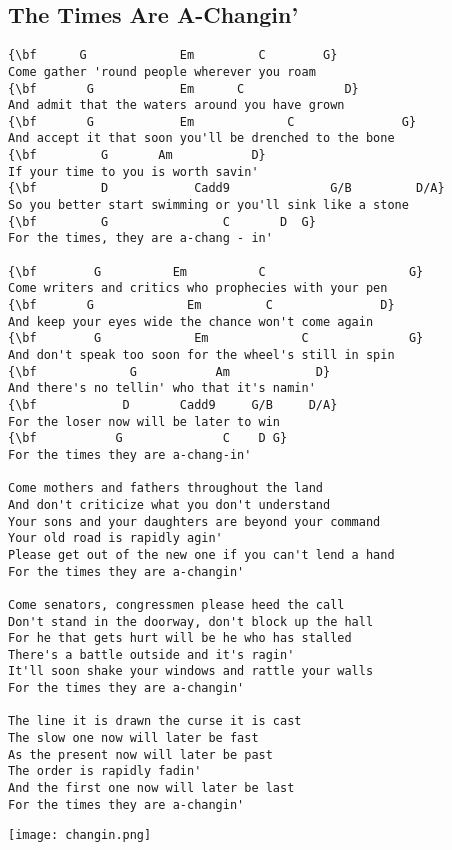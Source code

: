 \documentclass[a4paper]{article}
\begin{document}
\subsection{The Times Are A-Changin'} %
\label{sub:The Times Are A-Changin'}
\begin{Verbatim}[commandchars=\\\{\}]
{\bf      G             Em         C        G}
Come gather 'round people wherever you roam
{\bf       G            Em      C              D}
And admit that the waters around you have grown
{\bf       G            Em             C               G}
And accept it that soon you'll be drenched to the bone
{\bf         G       Am           D}
If your time to you is worth savin'
{\bf         D            Cadd9              G/B         D/A}
So you better start swimming or you'll sink like a stone
{\bf         G                C       D  G}
For the times, they are a-chang - in'

{\bf        G          Em          C                    G}
Come writers and critics who prophecies with your pen
{\bf       G             Em         C               D}
And keep your eyes wide the chance won't come again
{\bf        G             Em             C              G}
And don't speak too soon for the wheel's still in spin
{\bf             G           Am            D}
And there's no tellin' who that it's namin'
{\bf            D       Cadd9     G/B     D/A}
For the loser now will be later to win
{\bf           G              C    D G}
For the times they are a-chang-in'

Come mothers and fathers throughout the land
And don't criticize what you don't understand
Your sons and your daughters are beyond your command
Your old road is rapidly agin'
Please get out of the new one if you can't lend a hand
For the times they are a-changin'

Come senators, congressmen please heed the call
Don't stand in the doorway, don't block up the hall
For he that gets hurt will be he who has stalled
There's a battle outside and it's ragin'
It'll soon shake your windows and rattle your walls
For the times they are a-changin'

The line it is drawn the curse it is cast
The slow one now will later be fast
As the present now will later be past
The order is rapidly fadin'
And the first one now will later be last
For the times they are a-changin'
\end{Verbatim}
\newpage
\centerline{\texttt{[image: changin.png]}}
\newpage
\end{document}
